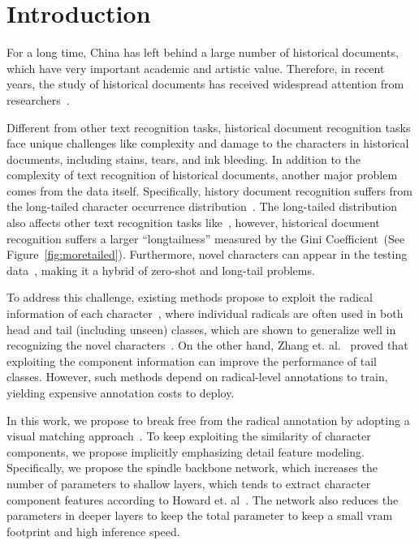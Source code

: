 \section{Introduction}

For a long time, China has left behind a large number of historical documents, which have very important academic and artistic value. 
Therefore, in recent years, the study of historical documents has received widespread attention from researchers~\cite{jinic21,hde,obc306}. 

Different from other text recognition tasks, historical document recognition tasks face unique challenges like complexity and damage to the characters in historical documents, including stains, tears, and ink bleeding. 
In addition to the complexity of text recognition of historical documents, another major problem comes from the data itself. Specifically, history document recognition suffers from the long-tailed character occurrence distribution~\cite{obc306mk2}. 
The long-tailed distribution also affects other text recognition tasks like~\cite{fudanvi}, however, historical document recognition suffers a larger ``longtailness'' measured by the Gini Coefficient~\cite{tailsurvey}(See Figure~\ref{fig:moretailed}). 
Furthermore, novel characters can appear in the testing data~\cite{jinic21}, making it a hybrid of zero-shot and long-tail problems.



To address this challenge, existing methods propose to exploit the radical information of each character~\cite{denseran}, where individual radicals are often used in both head and tail (including unseen) classes, which are shown to generalize well in recognizing the novel characters~\cite{fewran,zhang20pr}.
On the other hand, Zhang et. al.~\cite{sanicdar23}  proved that exploiting the component information can improve the performance of tail classes.
However, such methods depend on radical-level annotations to train, yielding expensive annotation costs to deploy.

In this work, we propose to break free from the radical annotation by adopting a visual matching approach~\cite{vsdf}. 
To keep exploiting the similarity of character components, we propose implicitly emphasizing detail feature modeling.  
Specifically, we propose the spindle backbone network, which increases the number of parameters to shallow layers, which tends to extract character component features according to Howard et. al~\cite{mobile}. The network also reduces the parameters in deeper layers to keep the total parameter to keep a small vram footprint and high inference speed. 

